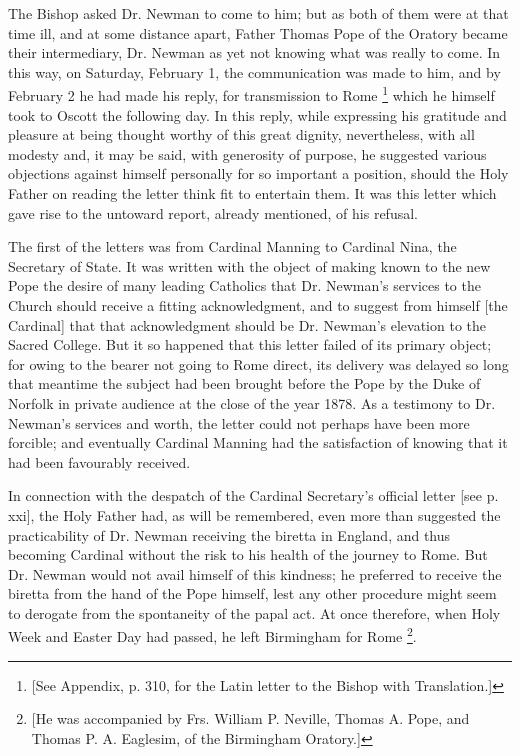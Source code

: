 The Bishop asked Dr. Newman to come to him; but as both of them
were at that time ill, and at some distance apart, Father Thomas Pope
of the Oratory became their intermediary, Dr. Newman as yet not
knowing what was really to come. In this way, on Saturday, February 1,
the communication was made to him, and by February 2 he had made his
reply, for transmission to Rome \footnote{[See Appendix,
p. 310, for the Latin letter to the Bishop with Translation.]} which he himself took to Oscott the following day. In this
reply, while expressing his gratitude and pleasure at being thought
worthy of this great dignity, nevertheless, with all modesty and, it
may be said, with generosity of purpose, he suggested various
objections against himself personally for so important a position,
should the Holy Father on reading the letter think fit to entertain
them. It was this letter which gave rise to the untoward report,
already mentioned, of his refusal.

The first of the letters was from Cardinal Manning to Cardinal
Nina, the Secretary of State. It was written with the object of making
known to the new Pope the desire of many leading Catholics that Dr.
Newman's services to the Church should receive a fitting
acknowledgment, and to suggest from himself [the Cardinal] that that
acknowledgment should be Dr. Newman's elevation to the Sacred College.
But it so happened that this letter failed of its primary
object; for owing to the bearer not going to Rome direct, its delivery
was delayed so long that meantime the subject had been brought before
the Pope by the Duke of Norfolk in private audience at the close of
the year 1878. As a testimony to Dr. Newman's services and worth, the
letter could not perhaps have been more forcible; and eventually
Cardinal Manning had the satisfaction of knowing that it had been
favourably received.

In connection with the despatch of the Cardinal Secretary's
official letter [see p. xxi], the Holy Father had, as will be
remembered, even more than suggested the practicability of Dr. Newman
receiving the biretta in England, and thus becoming Cardinal without
the risk to his health of the journey to Rome. But Dr. Newman would
not avail himself of this kindness; he preferred to receive the
biretta from the hand of the Pope himself, lest any other procedure
might seem to derogate from the spontaneity of the papal act. At once
therefore, when Holy Week and Easter Day had passed, he left
Birmingham for Rome \footnote{[He was
accompanied by Frs. William P. Neville, Thomas A. Pope, and Thomas P.
A. Eaglesim, of the Birmingham Oratory.]}.

